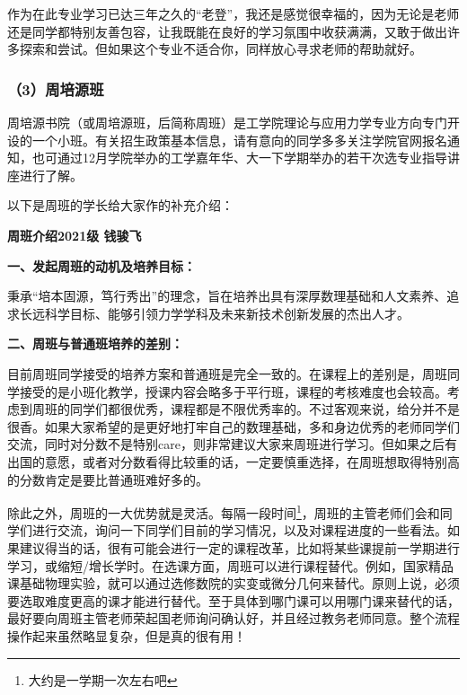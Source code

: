 \documentclass[11pt,oneside]{book}
\begin{document}
\vspace{10pt}

作为在此专业学习已达三年之久的“老登”，我还是感觉很幸福的，因为无论是老师还是同学都特别友善包容，让我既能在良好的学习氛围中收获满满，又敢于做出许多探索和尝试。但如果这个专业不适合你，同样放心寻求老师的帮助就好。

\subsubsection{（3）周培源班}

周培源书院（或周培源班，后简称周班）是工学院理论与应用力学专业方向专门开设的一个小班。有关招生政策基本信息，请有意向的同学多多关注学院官网报名通知，也可通过12月学院举办的工学嘉年华、大一下学期举办的若干次选专业指导讲座进行了解。

\vspace{10pt}

以下是周班的学长给大家作的补充介绍：

\textbf{周班介绍\quad 2021级 钱骏飞}

\vspace{10pt}

\textbf{\textbf{一、发起周班的动机及培养目标：}}

秉承“培本固源，笃行秀出”的理念，旨在培养出具有深厚数理基础和人文素养、追求长远科学目标、能够引领力学学科及未来新技术创新发展的杰出人才。

\vspace{10pt}

\textbf{\textbf{二、周班与普通班培养的差别：}}

目前周班同学接受的培养方案和普通班是完全一致的。在课程上的差别是，周班同学接受的是小班化教学，授课内容会略多于平行班，课程的考核难度也会较高。考虑到周班的同学们都很优秀，课程都是不限优秀率的。不过客观来说，给分并不是很香。如果大家希望的是更好地打牢自己的数理基础，多和身边优秀的老师同学们交流，同时对分数不是特别care，则非常建议大家来周班进行学习。但如果之后有出国的意愿，或者对分数看得比较重的话，一定要慎重选择，在周班想取得特别高的分数肯定是要比普通班难好多的。

\vspace{10pt}

除此之外，周班的一大优势就是灵活。每隔一段时间\footnote{大约是一学期一次左右吧}，周班的主管老师们会和同学们进行交流，询问一下同学们目前的学习情况，以及对课程进度的一些看法。如果建议得当的话，很有可能会进行一定的课程改革，比如将某些课提前一学期进行学习，或缩短/增长学时。在选课方面，周班可以进行课程替代。例如，国家精品课基础物理实验，就可以通过选修数院的实变或微分几何来替代。原则上说，必须要选取难度更高的课才能进行替代。至于具体到哪门课可以用哪门课来替代的话，最好要向周班主管老师荣起国老师询问确认好，并且经过教务老师同意。整个流程操作起来虽然略显复杂，但是真的很有用！
\end{document}
